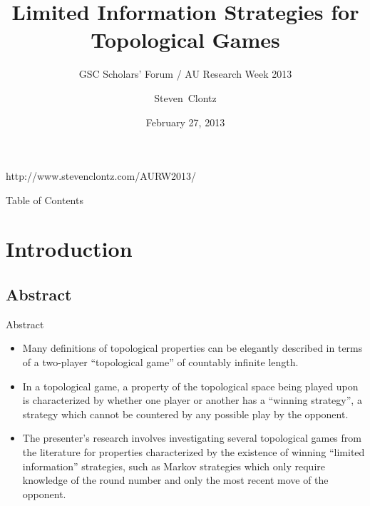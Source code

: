 \documentclass{beamer}
\title[Limited Information Strategies for Topological Games] %
{Limited Information Strategies for Topological Games}
\subtitle
{GSC Scholars' Forum / AU Research Week 2013} %
\author%
{Steven~Clontz}%
\institute[Auburn University] %
{
  Department of Mathematics and Statistics\\
  Auburn University}
\date[13-02-27] %
{February 27, 2013}
\begin{document}
\begin{frame}
  \titlepage

  {\tiny http://www.stevenclontz.com/AURW2013/}
\end{frame}

\begin{frame}{Table of Contents}
  \tableofcontents
\end{frame}




\section{Introduction}

\subsection{Abstract}

\begin{frame}{Abstract}%

  \begin{itemize}
  \item
    Many definitions of topological properties can be elegantly described in terms of a two-player ``topological game'' of countably infinite length. 
  \pause
  \item
    In a topological game, a property of the topological space being played upon is characterized by whether one player or another has a ``winning strategy'', a strategy which cannot be countered by any possible play by the opponent. 
  \pause
  \item 
    The presenter's research involves investigating several topological games from the literature for properties characterized by the existence of winning ``limited information'' strategies, such as Markov strategies which only require knowledge of the round number and only the most recent move of the opponent. 
  \end{itemize}
\end{frame}
\end{document}
